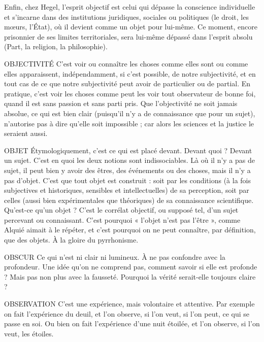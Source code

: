 Enfin, chez Hegel, l'esprit objectif est celui qui dépasse la conscience individuelle et
s’incarne dans des institutions juridiques, sociales ou politiques (le
droit, les mœurs, l’État), où il devient comme un objet pour lui-même. Ce
moment, encore prisonnier de ses limites territoriales, sera lui-même dépassé
dans l’esprit absolu (Part, la religion, la philosophie).

OBJECTIVITÉ C’est voir ou connaître les choses comme elles sont ou comme
elles apparaissent, indépendamment, si c’est possible, de
notre subjectivité, et en tout cas de ce que notre subjectivité peut avoir de particulier
ou de partial. En pratique, c’est voir les choses comme peut les voir tout
observateur de bonne foi, quand il est sans passion et sans parti pris. Que
l’objectivité ne soit jamais absolue, ce qui est bien clair (puisqu'il n’y a de
connaissance que pour un sujet), n'autorise pas à dire qu’elle soit impossible ;
car alors les sciences et la justice le seraient aussi.

OBJET Étymologiquement, c’est ce qui est placé devant. Devant quoi ?
Devant un sujet. C’est en quoi les deux notions sont indissociables.
Là où il n’y a pas de sujet, il peut bien y avoir des êtres, des événements ou des
choses, mais il n’y a pas d'objet. C’est que tout objet est construit : soit par les
conditions (à la fois subjectives et historiques, sensibles et intellectuelles) de sa
perception, soit par celles (aussi bien expérimentales que théoriques) de sa
connaissance scientifique. Qu’est-ce qu’un objet ? C’est le corrélat objectif, ou
supposé tel, d’un sujet percevant ou connaissant. C’est pourquoi « l'objet n’est
pas l'être », comme Alquié aimait à le répéter, et c’est pourquoi on ne peut
connaître, par définition, que des objets. À la gloire du pyrrhonisme.

OBSCUR Ce qui n’est ni clair ni lumineux. À ne pas confondre avec la profondeur.
Une idée qu’on ne comprend pas, comment savoir si elle
est profonde ? Mais pas non plus avec la fausseté. Pourquoi la vérité serait-elle
toujours claire ?

OBSERVATION C’est une expérience, mais volontaire et attentive. Par
exemple on fait l’expérience du deuil, et l’on observe, si
l’on veut, si l’on peut, ce qui se passe en soi. Ou bien on fait l’expérience d’une
nuit étoilée, et l’on observe, si l’on veut, les étoiles.

